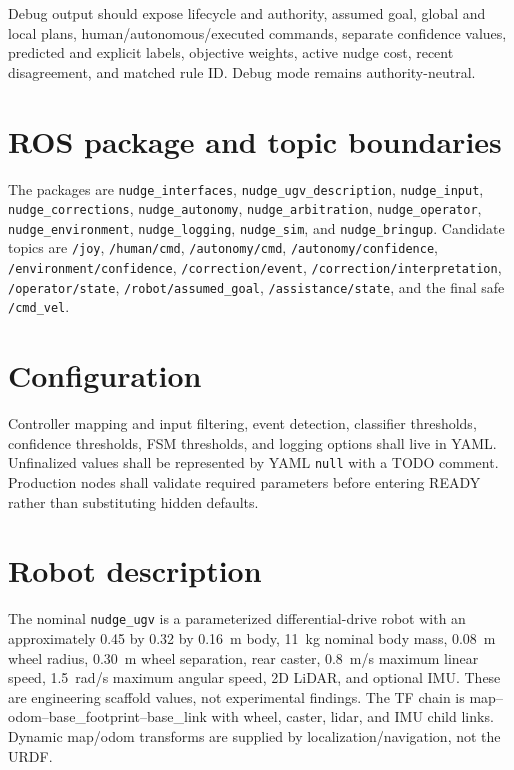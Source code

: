 \documentclass[11pt]{article}
\begin{document}
Debug output should expose lifecycle and authority, assumed goal, global and
local plans, human/autonomous/executed commands, separate confidence values,
predicted and explicit labels, objective weights, active nudge cost, recent
disagreement, and matched rule ID. Debug mode remains authority-neutral.

\section{ROS package and topic boundaries}
The packages are \texttt{nudge\_interfaces}, \texttt{nudge\_ugv\_description},
\texttt{nudge\_input}, \texttt{nudge\_corrections},
\texttt{nudge\_autonomy}, \texttt{nudge\_arbitration},
\texttt{nudge\_operator}, \texttt{nudge\_environment},
\texttt{nudge\_logging}, \texttt{nudge\_sim}, and
\texttt{nudge\_bringup}. Candidate topics are \texttt{/joy},
\texttt{/human/cmd}, \texttt{/autonomy/cmd},
\texttt{/autonomy/confidence}, \texttt{/environment/confidence},
\texttt{/correction/event}, \texttt{/correction/interpretation},
\texttt{/operator/state}, \texttt{/robot/assumed\_goal},
\texttt{/assistance/state}, and the final safe \texttt{/cmd\_vel}.

\section{Configuration}
Controller mapping and input filtering, event detection, classifier thresholds,
confidence thresholds, FSM thresholds, and logging options shall live in YAML.
Unfinalized values shall be represented by YAML \texttt{null} with a TODO
comment. Production nodes shall validate required parameters before entering
READY rather than substituting hidden defaults.

\section{Robot description}
The nominal \texttt{nudge\_ugv} is a parameterized differential-drive robot
with an approximately 0.45 by 0.32 by 0.16~m body, 11~kg nominal body mass,
0.08~m wheel radius, 0.30~m wheel separation, rear caster, 0.8~m/s maximum
linear speed, 1.5~rad/s maximum angular speed, 2D LiDAR, and optional IMU. These
are engineering scaffold values, not experimental findings. The TF chain is
map--odom--base\_footprint--base\_link with wheel, caster, lidar, and IMU child
links. Dynamic map/odom transforms are supplied by localization/navigation, not
the URDF.
\end{document}
